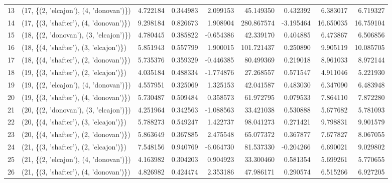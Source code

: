 \begin{tabular}{llrrrrrrr}
13 &  (17, \{(2, 'elcajon'), (4, 'donovan')\}) &   4.722184 &   0.344983 &   2.099153 &    45.149350 &   0.432392 &   6.383017 &   6.719327 \\
14 &  (17, \{(3, 'shafter'), (4, 'donovan')\}) &   9.298184 &   0.826673 &   1.908904 &   280.867574 &  -3.195464 &  16.650035 &  16.759104 \\
15 &  (18, \{(2, 'donovan'), (3, 'elcajon')\}) &   4.780445 &   0.385822 &  -0.654386 &    42.339170 &   0.404885 &   6.473867 &   6.506856 \\
16 &  (18, \{(4, 'shafter'), (3, 'elcajon')\}) &   5.851943 &   0.557799 &   1.900015 &   101.721437 &   0.250890 &   9.905119 &  10.085705 \\
17 &  (18, \{(4, 'shafter'), (2, 'donovan')\}) &   5.735376 &   0.359329 &  -0.446385 &    80.499369 &   0.219018 &   8.961033 &   8.972144 \\
18 &  (19, \{(3, 'shafter'), (2, 'elcajon')\}) &   4.035184 &   0.488334 &  -1.774876 &    27.268557 &   0.571547 &   4.911046 &   5.221930 \\
19 &  (19, \{(2, 'elcajon'), (4, 'donovan')\}) &   4.557951 &   0.325069 &   1.325153 &    42.041587 &   0.483030 &   6.347090 &   6.483948 \\
20 &  (19, \{(3, 'shafter'), (4, 'donovan')\}) &   5.730487 &   0.509484 &   0.358573 &    61.972795 &   0.079533 &   7.864110 &   7.872280 \\
21 &  (20, \{(2, 'donovan'), (3, 'elcajon')\}) &   4.251964 &   0.342563 &  -1.088563 &    33.421038 &   0.530888 &   5.677682 &   5.781093 \\
22 &  (20, \{(4, 'shafter'), (3, 'elcajon')\}) &   5.788273 &   0.549247 &   1.422737 &    98.041273 &   0.271421 &   9.798831 &   9.901579 \\
23 &  (20, \{(4, 'shafter'), (2, 'donovan')\}) &   5.863649 &   0.367885 &   2.475548 &    65.077372 &   0.367877 &   7.677827 &   8.067055 \\
24 &  (21, \{(3, 'shafter'), (2, 'elcajon')\}) &   7.548156 &   0.940769 &  -6.064730 &    81.537330 &  -0.204266 &   6.690021 &   9.029802 \\
25 &  (21, \{(2, 'elcajon'), (4, 'donovan')\}) &   4.163982 &   0.304203 &   0.904923 &    33.300460 &   0.581354 &   5.699261 &   5.770655 \\
26 &  (21, \{(3, 'shafter'), (4, 'donovan')\}) &   4.826982 &   0.424474 &   2.353186 &    47.986171 &   0.290574 &   6.515266 &   6.927205 \\
\bottomrule
\end{tabular}
